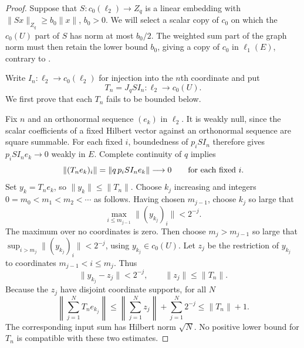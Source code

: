 
\begin{proof}
Suppose that \(S:c_0(\ell_2)\to Z_q\) is a linear embedding with
\(\|Sx\|_{Z_q}\ge b_0\|x\|\), \(b_0>0\).
We will select a scalar copy of \(c_0\) on which the \(c_0(U)\)
part of \(S\) has norm at most \(b_0/2\). The weighted sum part of
the graph norm must then retain the lower bound \(b_0\), giving a
copy of \(c_0\) in \(\ell_1(E)\), contrary to
.

Write
\(I_n:\ell_2\to c_0(\ell_2)\) for injection into the \(n\)th
coordinate and put
\[
 T_n=J_qSI_n:\ell_2\to c_0(U).
\]
We first prove that each \(T_n\) fails to be bounded below.

Fix \(n\) and an orthonormal sequence \((e_k)\) in \(\ell_2\).
It is weakly null, since the scalar coefficients of a fixed Hilbert
vector against an orthonormal sequence are square summable. For each
fixed \(i\), boundedness of \(p_iSI_n\) therefore gives
\(p_iSI_ne_k\to0\) weakly in \(E\). Complete continuity of \(q\)
implies
\[
 \|(T_ne_k)_i\|=\|q\,p_iSI_ne_k\|\longrightarrow0
 \qquad\hbox{for each fixed }i.
\]
Set \(y_k=T_ne_k\), so \(\|y_k\|\le\|T_n\|\).
Choose \(k_j\) increasing and integers
\(0=m_0<m_1<m_2<\cdots\) as follows. Having chosen \(m_{j-1}\),
choose \(k_j\) so large that
\[
 \max_{i\le m_{j-1}}\|(y_{k_j})_i\|<2^{-j}.
\]
The maximum over no coordinates is zero. Then choose \(m_j>m_{j-1}\)
so large that \(\sup_{i>m_j}\|(y_{k_j})_i\|<2^{-j}\), using
\(y_{k_j}\in c_0(U)\). Let \(z_j\) be the restriction of \(y_{k_j}\)
to coordinates \(m_{j-1}<i\le m_j\). Thus
\[
 \|y_{k_j}-z_j\|<2^{-j},\qquad \|z_j\|\le\|T_n\|.
\]
Because the \(z_j\) have disjoint coordinate supports, for all \(N\)
\[
 \left\|\sum_{j=1}^N T_ne_{k_j}\right\|
 \le \left\|\sum_{j=1}^N z_j\right\|
          +\sum_{j=1}^N2^{-j}
 \le \|T_n\|+1.
\]
The corresponding input sum has Hilbert norm \(\sqrt N\).
No positive lower bound for \(T_n\) is compatible with these two
estimates.


\end{proof}
